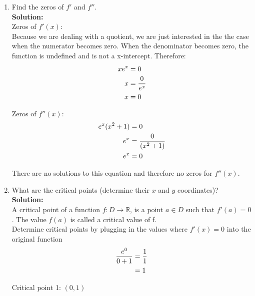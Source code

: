 \documentclass[a4paper]{article}
\begin{document}
\begin{enumerate}
\begin{enumerate}
	
	\item Find the zeros of $f'$ and $f''$.\\
	\textbf{Solution:}\\
	
Zeros of $f'(x)$:\\

Because we are dealing with a quotient, we are just interested in the the case when the numerator becomes zero. When the denominator becomes zero, the function is undefined and is not a x-intercept. Therefore:\\

\begin{align}
	xe^x &= 0\notag\\
	x &= \frac{0}{e^x}\notag\\
	x &= 0\notag
\end{align}	
	
Zeros of $f''(x)$:\\	

\begin{align}
	e^x(x^2+1) &= 0\notag\\
	e^x &= \frac{0}{(x^2+1)}\notag\\
	e^x &= 0\notag
\end{align}	

There are no solutions to this equation and therefore no zeros for $f''(x)$.\\
	
	
	\item What are the critical points (determine their $x$ and $y$ coordinates)?\\
	\textbf{Solution:}\\
	
A critical point of a function $f: D \rightarrow \mathbb{R}$, is a point $a \in D$ such that $f'(a) = 0$. The value $f(a)$ is called a critical value of f.\\


Determine critical points by plugging in the values where $f'(x) = 0$ into the original function\\



\begin{align*}
	\frac{e^0}{0+1} &= \frac{1}{1}\notag\\
	&= 1\notag
\end{align*}
	
Critical point 1: $(0,1)$\\	
	

\end{enumerate}
\end{enumerate}
\end{document}
